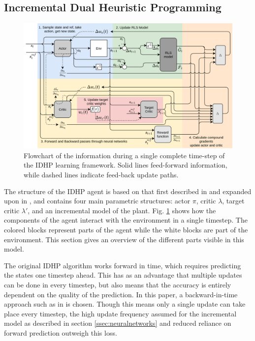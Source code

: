\subsection{Incremental Dual Heuristic Programming} \label{ssec:idhp}

\begin{figure}[h!t]
    \centering
    \includegraphics[width=\textwidth]{fig/2/flowchart.png}
    \caption{Flowchart of the information during a single complete time-step of the IDHP learning framework. Solid lines feed-forward information, while dashed lines indicate feed-back update paths. }
    \label{fig:idhp_flowchart}
\end{figure}

The structure of the IDHP agent is based on that first described in \cite{Zhou2018DHP} and expanded upon in \cite{Heyer2020}, and contains four main parametric structures: actor $\pi$, critic $\lambda$, target critic $\lambda'$, and an incremental model of the plant. Fig. \ref{fig:idhp_flowchart} shows how the components of the agent interact with the environment in a single timestep. The colored blocks represent parts of the agent while the white blocks are part of the environment. This section gives an overview of the different parts visible in this model. 

The original IDHP algorithm works forward in time, which requires predicting the states one timestep ahead. This has as an advantage that multiple updates can be done in every timestep, but also means that the accuracy is entirely dependent on the quality of the prediction. In this paper, a backward-in-time approach such as in \cite{Heyer2020, Enns2003a} is chosen. Though this means only a single update can take place every timestep, the high update frequency assumed for the incremental model as described in section \ref{ssec:neuralnetworks} and reduced reliance on forward prediction outweigh this loss.

